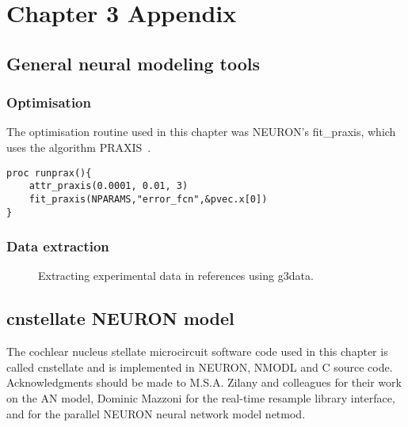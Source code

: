 
\section{Chapter 3 Appendix    \label{sec:ch3:appendix}}

\subsection{General neural modeling tools}

\subsubsection{Optimisation}

The optimisation routine used in this chapter was NEURON's \textsf{fit\_praxis},
which uses the algorithm PRAXIS~\citep{Brent:1976}.

\begin{lstlisting}[label=lbl:runprax,caption=Set optimisation attributes and run
  fitting procedure.]
  proc runprax(){ 
    attr_praxis(0.0001, 0.01, 3)
    fit_praxis(NPARAMS,"error_fcn",&pvec.x[0]) 
}
\end{lstlisting}


\subsubsection{Data extraction    \label{sec:data-extraction}}


\begin{figure}[htb]
  \begin{center}
    \caption{Extracting experimental data in references using g3data.}
    \label{fig:Extractdata}
  \end{center}
\end{figure}


\subsection{\textsf{cnstellate} NEURON model    \label{sec:cnstellate-neur-model}}

The cochlear nucleus stellate microcircuit software code used in this chapter is
called \textsf{cnstellate} and is implemented in NEURON, NMODL and C source
code. Acknowledgments should be made to M.S.A. Zilany and colleagues for their
work on the AN model, Dominic Mazzoni for the real-time resample library
interface, and \citet{MiglioreCanniaEtAl:2006} for the parallel NEURON neural
network model \textsf{netmod}.

